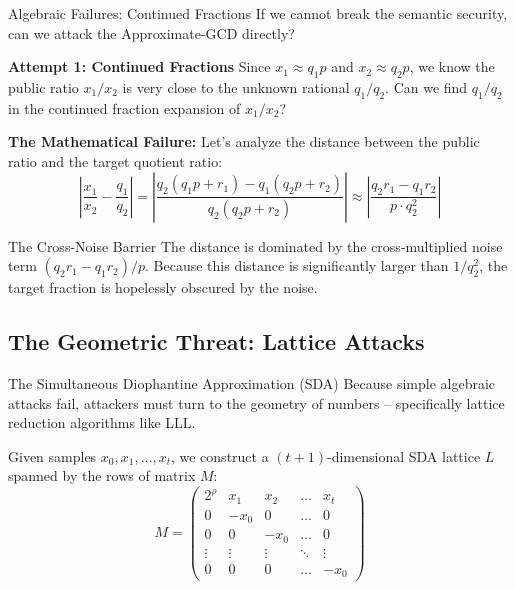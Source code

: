 \documentclass[10pt,handout]{beamer}
\begin{document}
\begin{frame}{Algebraic Failures: Continued Fractions}
    If we cannot break the semantic security, can we attack the Approximate-GCD directly?
    
    \vspace{0.2cm}
    \textbf{Attempt 1: Continued Fractions}
    Since $x_1 \approx q_1 p$ and $x_2 \approx q_2 p$, we know the public ratio $x_1 / x_2$ is very close to the unknown rational $q_1 / q_2$. Can we find $q_1/q_2$ in the continued fraction expansion of $x_1/x_2$?
    \pause
    
    \vspace{0.2cm}
    \textbf{The Mathematical Failure:}
    Let's analyze the distance between the public ratio and the target quotient ratio:
    $$ \left| \frac{x_1}{x_2} - \frac{q_1}{q_2} \right| = \left| \frac{q_2(q_1 p + r_1) - q_1(q_2 p + r_2)}{q_2(q_2 p + r_2)} \right| \approx \left| \frac{q_2 r_1 - q_1 r_2}{p \cdot q_2^2} \right| $$
    \pause
    
    \begin{block}{The Cross-Noise Barrier}
    The distance is dominated by the cross-multiplied noise term $(q_2 r_1 - q_1 r_2) / p$. Because this distance is significantly larger than $1/q_2^2$, the target fraction is hopelessly obscured by the noise.
    \end{block}
\end{frame}

\subsection{The Geometric Threat: Lattice Attacks}

\begin{frame}{The Simultaneous Diophantine Approximation (SDA)}
    Because simple algebraic attacks fail, attackers must turn to the geometry of numbers -- specifically lattice reduction algorithms like LLL.
    \pause
    
    \vspace{0.2cm}
    Given samples $x_0, x_1, \dots, x_t$, we construct a $(t+1)$-dimensional SDA lattice $L$ spanned by the rows of matrix $M$:
    $$ M = \begin{pmatrix} 
    2^\rho & x_1 & x_2 & \dots & x_t \\ 
    0 & -x_0 & 0 & \dots & 0 \\ 
    0 & 0 & -x_0 & \dots & 0 \\ 
    \vdots & \vdots & \vdots & \ddots & \vdots \\ 
    0 & 0 & 0 & \dots & -x_0 
    \end{pmatrix} $$
\end{frame}
\end{document}
